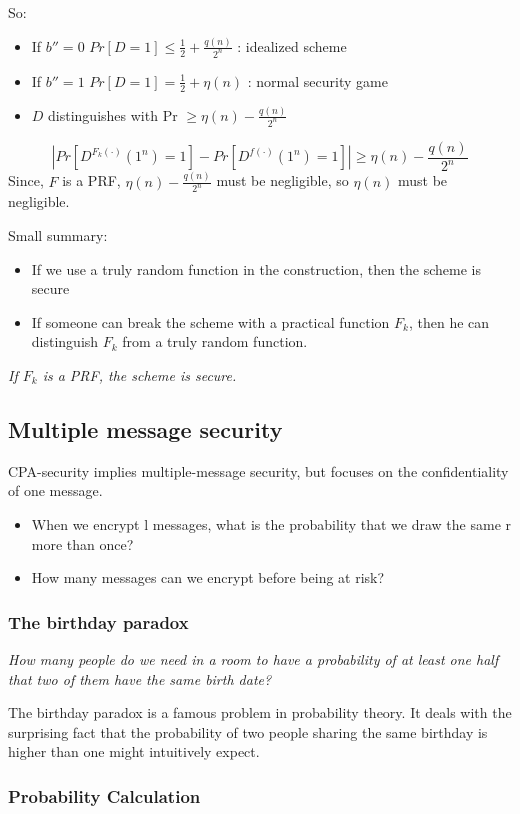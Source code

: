 \documentclass[12pt]{article}
\begin{document}
So:
\begin{itemize}
\item If $b''=0$ $Pr[D=1] \le \frac12 + \frac{q(n)}{2^n}$ : idealized scheme
\item If $b''=1$ $Pr[D=1] = \frac12 + \eta(n)$ : normal security game 
\item $D$ distinguishes with Pr $\ge \eta(n)-\frac{q(n)}{2^n}$
\end{itemize}
\begin{equation*}
|Pr[D^{F_k(\cdot)}(1^n)=1]-Pr[D^{f(\cdot)}(1^n)=1]| \ge \eta(n)-\frac{q(n)}{2^n}
\end{equation*}
Since, $F$ is a PRF, $\eta(n)-\frac{q(n)}{2^n}$ must be negligible, so $\eta(n)$ must be negligible.

Small summary:
\begin{itemize}
\item If we use a truly random function in the construction, then the scheme is secure
\item If someone can break the scheme with a practical function $F_k$, then he can distinguish $F_k$ from a truly random function.
\end{itemize}
\emph{If $F_k$ is a PRF, the scheme is secure.}
\subsection{Multiple message security}
CPA-security implies multiple-message security, but focuses on the confidentiality of one message.
\begin{itemize}
\item When we encrypt l messages, what is the probability that we draw the same r more than once?
\item How many messages can we encrypt before being at risk?
\end{itemize}
\newpage

\subsubsection{The birthday paradox}
\emph{How many people do we need in a room to have a probability of at least one half that two of them have the same birth date?}

The birthday paradox is a famous problem in probability theory. It deals with the surprising fact that the probability of two people sharing the same birthday is higher than one might intuitively expect.

\subsubsection*{Probability Calculation}
\end{document}
